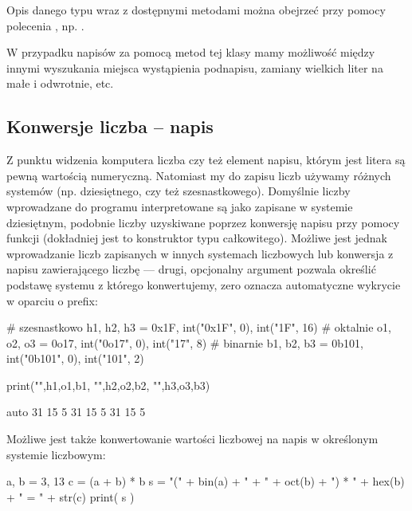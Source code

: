 Opis danego typu wraz z dostępnymi metodami można obejrzeć przy pomocy polecenia , np. .

W przypadku napisów za pomocą metod tej klasy mamy możliwość między innymi wyszukania miejsca wystąpienia podnapisu, zamiany wielkich liter na małe i odwrotnie, etc.

\subsection{Konwersje liczba -- napis}

Z punktu widzenia komputera liczba czy też element napisu, którym jest litera są pewną wartością numeryczną.
Natomiast my do zapisu liczb używamy różnych systemów (np. dziesiętnego, czy też szesnastkowego).
Domyślnie liczby wprowadzane do programu interpretowane są jako zapisane w systemie dziesiętnym,
podobnie liczby uzyskiwane poprzez konwersję napisu przy pomocy funkcji  (dokładniej jest to konstruktor typu całkowitego).
Możliwe jest jednak wprowadzanie liczb zapisanych w innych systemach liczbowych lub konwersja z napisu zawierającego liczbę ---
drugi, opcjonalny argument  pozwala określić podstawę systemu z którego konwertujemy, zero oznacza automatyczne wykrycie w oparciu o prefix:

\begin{CodeFrame}[python]{0.7\textwidth}
# szesnastkowo
h1, h2, h3 = 0x1F, int("0x1F", 0), int("1F", 16)
# oktalnie
o1, o2, o3 = 0o17, int("0o17", 0), int("17", 8)
# binarnie
b1, b2, b3 = 0b101, int("0b101", 0), int("101", 2)

print("",h1,o1,b1, "\n",h2,o2,b2, "\n",h3,o3,b3)
\end{CodeFrame}
\begin{CodeFrame}{auto}
 31 15 5
 31 15 5
 31 15 5
\end{CodeFrame}

Możliwe jest także konwertowanie wartości liczbowej na napis w określonym systemie liczbowym:

\begin{CodeFrame*}[python]{}
a, b = 3, 13
c = (a + b) * b
s = "(" + bin(a) + " + " + oct(b) + ") * " + hex(b) + " = " + str(c)
print( s )
\end{CodeFrame*} 

